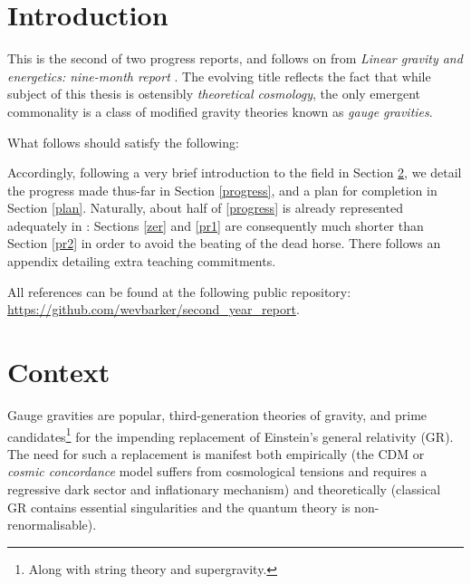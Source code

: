 \documentclass[twoside]{report}
\begin{document}
\appedndixtitleon
\appedndixtitletocon



\begin{multicols}{2}
\section{Introduction}
This is the second of two progress reports, and follows on from \textit{Linear gravity and energetics: nine-month report} \cite{lg}. The evolving title reflects the fact that while subject of this thesis is ostensibly \textit{theoretical cosmology}, the only emergent commonality is a class of modified gravity theories known as \textit{gauge gravities}.

What follows should satisfy the following:

\noindent{}

Accordingly, following a very brief introduction to the field in Section \ref{context}, we detail the progress made thus-far in Section \ref{progress}, and a plan for completion in Section \ref{plan}. Naturally, about half of \ref{progress} is already represented adequately in \cite{lg}: Sections \ref{zer} and \ref{pr1} are consequently much shorter than Section \ref{pr2} in order to avoid the beating of the dead horse. There follows an appendix detailing extra teaching commitments.

All references can be found at the following public repository: \url{https://github.com/wevbarker/second_year_report}.
\section{Context}\label{context}
Gauge gravities are popular, third-generation theories of gravity, and prime candidates\footnote{Along with string theory and supergravity.} for the impending replacement of Einstein's general relativity (GR). The need for such a replacement is manifest both empirically (the \textLambda CDM or \textit{cosmic concordance} model suffers from cosmological tensions and requires a regressive dark sector and inflationary mechanism) and theoretically (classical GR contains essential singularities and the quantum theory is non-renormalisable).


\end{multicols}
\end{document}
